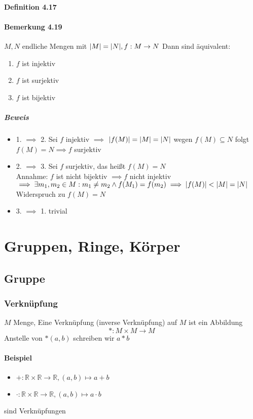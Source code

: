 \documentclass[a4paper]{scrartcl}
\DeclarePairedDelimiter\abs{\lvert}{\rvert}%
\theoremstyle{definition}
\theoremstyle{plain}
\theoremstyle{plain}
\theoremstyle{remark}
\theoremstyle{remark}
\theoremstyle{remark}
\theoremstyle{remark}
\theoremstyle{remark}
\begin{document}
\paragraph{Definition 4.17}
\label{sec-2-6-7-9}
\paragraph{Bemerkung 4.19}
\label{sec-2-6-7-10}
$M,N$ endliche Mengen mit $\abs{M} = \abs{N},f:M\to N$ Dann sind äquivalent:
\begin{enumerate}
\item $f$ ist injektiv
\item $f$ ist surjektiv
\item $f$ ist bijektiv
\end{enumerate}
\subparagraph{Beweis}
\label{sec-2-6-7-10-1}
\begin{itemize}
\item 1. $\implies$ 2. Sei $f$ injektiv $\implies$ $\abs{f(M)} = \abs{M} = \abs{N}$ wegen $f(M) \subseteq N$ folgt $f(M) = N \implies f$ surjektiv
\item 2. $\implies$ 3. Sei $f$ surjektiv, das heißt $f(M) = N$ \\
                Annahme: $f$ ist nicht bijektiv $\implies f$ nicht injektiv $\implies \exists m_1,m_2\in M: m_1\neq m_2 \wedge f(M_1) = f(m_2) \implies \abs{f(M)} < \abs{M} = \abs{N}$ Widerspruch zu $f(M) = N$
\item 3. $\implies$ 1. trivial
\end{itemize}
\section{Gruppen, Ringe, Körper}
\label{sec-3}
\subsection{Gruppe}
\label{sec-3-1}
\subsubsection{Verknüpfung}
\label{sec-3-1-1}
$M$ Menge, Eine Verknüpfung (inverse Verknüpfung) auf $M$ ist ein Abbildung \[*:M\times M \to M\]
Anstelle von $*(a,b)$ schreiben wir $a * b$
\paragraph{Beispiel}
\label{sec-3-1-1-1}
\begin{itemize}
\item $+: \mathbb{R} \times \mathbb{R} \to \mathbb{R},(a,b) \mapsto a + b$
\item $\cdot: \mathbb{R} \times \mathbb{R} \to \mathbb{R},(a,b) \mapsto a\cdot b$
\end{itemize}
sind Verknüpfungen
\end{document}
